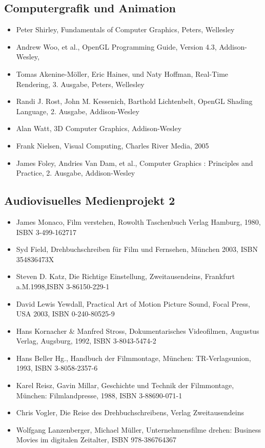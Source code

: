 \subsection*{Computergrafik und
Animation}\label{computergrafik-und-animation-3}

\begin{itemize}
\tightlist
\item
  Peter Shirley, Fundamentals of Computer Graphics, Peters, Wellesley
\item
  Andrew Woo, et al., OpenGL Programming Guide, Version 4.3,
  Addison-Wesley,
\item
  Tomas Akenine-Möller, Eric Haines, und Naty Hoffman, Real-Time
  Rendering, 3. Ausgabe, Peters, Wellesley
\item
  Randi J. Rost, John M. Kessenich, Barthold Lichtenbelt, OpenGL Shading
  Language, 2. Ausgabe, Addison-Wesley
\item
  Alan Watt, 3D Computer Graphics, Addison-Wesley
\item
  Frank Nielsen, Visual Computing, Charles River Media, 2005
\item
  James Foley, Andries Van Dam, et al., Computer Graphics : Principles
  and Practice, 2. Ausgabe, Addison-Wesley
\end{itemize}

\subsection*{Audiovisuelles Medienprojekt
2}\label{audiovisuelles-medienprojekt-2-3}

\begin{itemize}
\tightlist
\item
  James Monaco, Film verstehen, Rowolth Taschenbuch Verlag Hamburg,
  1980, ISBN 3-499-162717
\item
  Syd Field, Drehbuchschreiben für Film und Fernsehen, München 2003,
  ISBN 354836473X
\item
  Steven D. Katz, Die Richtige Einstellung, Zweitausendeins, Frankfurt
  a.M.1998,ISBN 3-86150-229-1
\item
  David Lewis Yewdall, Practical Art of Motion Picture Sound, Focal
  Press, USA 2003, ISBN 0-240-80525-9
\item
  Hans Kornacher \& Manfred Stross, Dokumentarisches Videofilmen,
  Augustus Verlag, Augsburg, 1992, ISBN 3-8043-5474-2
\item
  Hans Beller Hg., Handbuch der Filmmontage, München: TR-Verlagsunion,
  1993, ISBN 3-8058-2357-6
\item
  Karel Reisz, Gavin Millar, Geschichte und Technik der Filmmontage,
  München: Filmlandpresse, 1988, ISBN 3-88690-071-1
\item
  Chris Vogler, Die Reise des Drehbuchschreibens, Verlag Zweitausendeins
\item
  Wolfgang Lanzenberger, Michael Müller, Unternehmensfilme drehen:
  Business Movies im digitalen Zeitalter, ISBN 978-386764367
\end{itemize}

